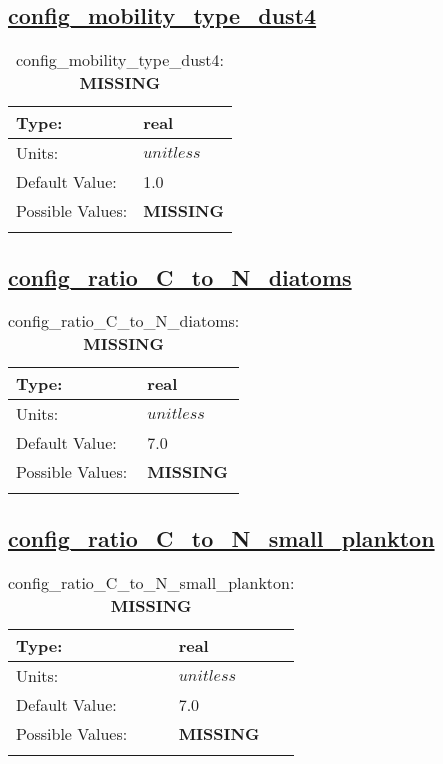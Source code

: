\subsection[config\_mobility\_type\_dust4]{\hyperref[sec:nm_tab_biogeochemistry]{config\_mobility\_type\_dust4}}
\label{subsec:nm_sec_config_mobility_type_dust4}
\begin{center}
\begin{longtable}{| p{2.0in} || p{4.0in} |}
    \hline
    Type: & real \\
    \hline
    Units: & $unitless$ \\
    \hline
    Default Value: & 1.0 \\
    \hline
    Possible Values: & {\bf \color{red} MISSING} \\
    \hline
    \caption{config\_mobility\_type\_dust4: {\bf \color{red} MISSING}}
\end{longtable}
\end{center}
\subsection[config\_ratio\_C\_to\_N\_diatoms]{\hyperref[sec:nm_tab_biogeochemistry]{config\_ratio\_C\_to\_N\_diatoms}}
\label{subsec:nm_sec_config_ratio_C_to_N_diatoms}
\begin{center}
\begin{longtable}{| p{2.0in} || p{4.0in} |}
    \hline
    Type: & real \\
    \hline
    Units: & $unitless$ \\
    \hline
    Default Value: & 7.0 \\
    \hline
    Possible Values: & {\bf \color{red} MISSING} \\
    \hline
    \caption{config\_ratio\_C\_to\_N\_diatoms: {\bf \color{red} MISSING}}
\end{longtable}
\end{center}
\subsection[config\_ratio\_C\_to\_N\_small\_plankton]{\hyperref[sec:nm_tab_biogeochemistry]{config\_ratio\_C\_to\_N\_small\_plankton}}
\label{subsec:nm_sec_config_ratio_C_to_N_small_plankton}
\begin{center}
\begin{longtable}{| p{2.0in} || p{4.0in} |}
    \hline
    Type: & real \\
    \hline
    Units: & $unitless$ \\
    \hline
    Default Value: & 7.0 \\
    \hline
    Possible Values: & {\bf \color{red} MISSING} \\
    \hline
    \caption{config\_ratio\_C\_to\_N\_small\_plankton: {\bf \color{red} MISSING}}
\end{longtable}
\end{center}
